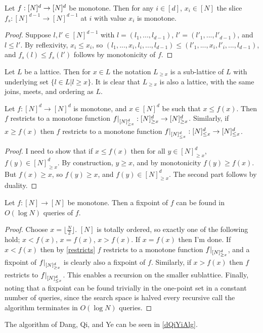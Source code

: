 \begin{lemma}
  Let $f : [N]^d \to [N]^d$ be monotone. Then for any $i \in [d]$, $x_i \in [N]$ the slice $f_s : [N]^{d-1} \to [N]^{d-1}$ at $i$ with value $x_i$  
  is monotone. 
\end{lemma}
\begin{proof}
  Suppose $l, l' \in [N]^{d-1}$ with $l = (l_1, ..., l_{d-1})$, $l' = (l'_1, ..., l'_{d-1})$, and $l \leq l'$.
  By reflexivity, $x_i \leq x_i$, so $(l_1, ... , x_i, l_i, ..., l_{d-1}) \leq (l'_1, ... , x_i, l'_i, ..., l_{d-1})$,
  and $f_s(l) \leq f_s(l')$ follows by monotonicity of $f$.
\end{proof}
\begin{notation}
  Let $L$ be a lattice. Then for $x \in L$ the notation $L_{\geq x}$ is a sub-lattice of $L$ with underlying set
  $\{l \in L | l \geq x\}$. It is clear that $L_{\geq x}$ is also a lattice, with the same joins, meets, and ordering as $L$.
\end{notation}
\begin{lemma}\label{restricts}
  Let $f : [N]^d \to [N]^d$ is monotone, and $x \in [N]^d$ be such that $x \leq f(x)$. Then
  $f$ restricts to a monotone function $\restr{f}{[N]^d_{\geq x}} : [N]^d_{\geq x} \to [N]^d_{\geq x}$. Similarly,
  if $x \geq f(x)$ then $f$ restricts to a monotone function $\restr{f}{[N]^d_{\leq x}} : [N]^d_{\leq x} \to [N]^d_{\leq x}$.
\end{lemma}
\begin{proof}
  I need to show that if $x \leq f(x)$ then for all $y \in [N]^d_{\geq x}$, $f(y) \in [N]^d_{\geq x}$. By construction,
  $y \geq x$, and by monotonicity $f(y) \geq f(x)$. But $f(x) \geq x$, so $f(y) \geq x$, and $f(y) \in [N]^d_{\geq x}$. The second part
  follows by duality.
\end{proof}
\begin{lemma}\label{d1Case}
  Let $f : [N] \to [N]$ be monotone. Then a fixpoint of $f$ can be found in $O(\log N)$ queries of $f$.
\end{lemma}
\begin{proof}
  Choose $x = \lfloor \frac{N}{2} \rfloor$. $[N]$ is totally ordered, so exactly one of the following hold; $x < f(x)$, $x = f(x)$, $x > f(x)$.
  If $x = f(x)$ then I'm done. If $x < f(x)$ then by \cref{restricts} $f$ restricts to a monotone function $\restr{f}{[N]^d_{\geq x}}$, 
  and a fixpoint of $\restr{f}{[N]^d_{\geq x}}$ is clearly also a fixpoint of $f$. Similarly, if $x > f(x)$ then $f$ restricts to
  $\restr{f}{[N]^d_{\leq x}}$. This enables a recursion on the smaller sublattice. Finally,
  noting that a fixpoint can be found trivially in the one-point set in a constant number of queries,
  since the search space is halved every recursive call
  the algorithm terminates in $O(\log N)$ queries.
\end{proof}
The algorithm of Dang, Qi, and Ye can be seen in \cref{dQiYiAlg}.

